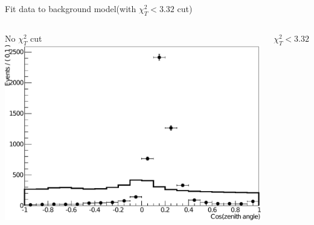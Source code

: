 \documentclass[14pt]{beamer}
\begin{document}
\begin{frame}{Fit data to background model}{(with $\chi^{2}_{T} < 3.32$ cut)}
	\begin{columns}[T]
		\centering
		\begin{block}{\centering No $\chi^{2}_{T}$ cut}
			\centering
			\includegraphics[width=\linewidth]{fit_data_to_bkg_model_noChi2TCut.pdf}
		\end{block}
		\centering
		\begin{block}{\centering $\chi^{2}_{T} < 3.32$}
\end{block}
\end{columns}
\end{frame}
\end{document}
